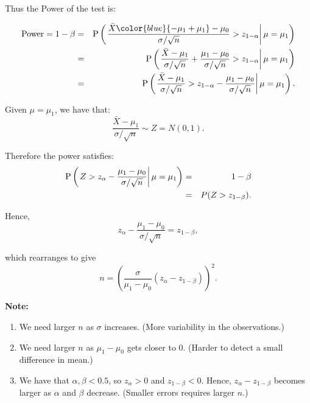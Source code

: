 \documentclass[
]{book}
\providecommand{\tightlist}{%
  \setlength{\itemsep}{0pt}\setlength{\parskip}{0pt}}
\begin{document}
Thus the Power of the test is:

\begin{eqnarray*}
\mbox{Power}= 1-\beta&=& {\rm P} \left( \left. \frac{\bar{X} \color{blue}{-\mu_1 +\mu_1} -\mu_0}{\sigma/\sqrt{n}} > z_{1-\alpha} \right| \mu=\mu_1\right) \\
&=& {\rm P} \left( \left. \frac{\bar{X} -\mu_1}{\sigma/\sqrt{n}} + \frac{\mu_1 - \mu_0}{\sigma/\sqrt{n}}  > z_{1-\alpha} \right| \mu=\mu_1\right) \\
&=& {\rm P} \left( \left. \frac{\bar{X} -\mu_1}{\sigma/\sqrt{n}}   > z_{1-\alpha} - \frac{\mu_1 - \mu_0}{\sigma/\sqrt{n}} \right| \mu=\mu_1\right). \end{eqnarray*}

Given \(\mu = \mu_1\), we have that:\\

\[\frac{\bar{X} -\mu_1}{\sigma/\sqrt{n}} \sim Z = N(0,1). \]

Therefore the power satisfies:\\

\begin{eqnarray*}
{\rm P} \left( \left. Z  > z_{\alpha} - \frac{\mu_1 - \mu_0}{\sigma/\sqrt{n}} \right| \mu=\mu_1\right) &=& 1-\beta \\ &=& P(Z > z_{1-\beta}). \end{eqnarray*}

Hence,\\

\[ z_{\alpha} - \frac{\mu_1 - \mu_0}{\sigma/\sqrt{n}} = z_{1-\beta}, \]

which rearranges to give\\

\[ n = \left( \frac{\sigma}{\mu_1 - \mu_0} (z_\alpha - z_{1-\beta}) \right)^2. \]

\hfill\break

\textbf{Note:}

\begin{enumerate}
\def\labelenumi{\arabic{enumi}.}
\tightlist
\item
  We need larger \(n\) as \(\sigma\) increases. (More variability in the observations.)\\
\item
  We need larger \(n\) as \(\mu_1 - \mu_0\) gets closer to 0. (Harder to detect a small difference in mean.)\\
\item
  We have that \(\alpha, \beta <0.5\), so \(z_{\alpha} >0\) and \(z_{1-\beta} <0\). Hence, \(z_{\alpha} - z_{1-\beta}\) becomes larger as \(\alpha\) and \(\beta\) decrease. (Smaller errors requires larger \(n\).)
\end{enumerate}
\end{document}
